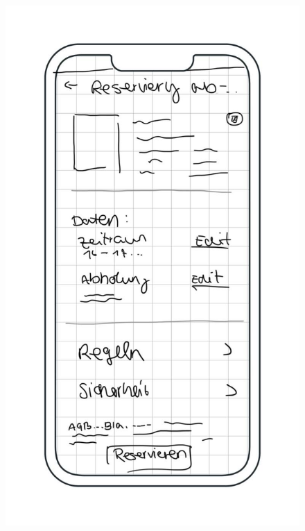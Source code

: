 \begin{figure}[h]
    \centering
    \includegraphics[scale=0.3]{Bilder/Mockups/Reservierung abschlie0en.jpg}

\end{figure}
